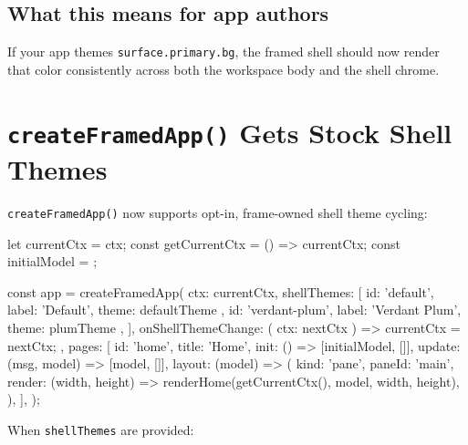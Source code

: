 \subsection{What this means for app authors}\label{record-279-what-this-means-for-app-authors}

If your app themes \texttt{s\allowbreak{}u\allowbreak{}r\allowbreak{}f\allowbreak{}a\allowbreak{}c\allowbreak{}e\allowbreak{}.\allowbreak{}p\allowbreak{}r\allowbreak{}i\allowbreak{}m\allowbreak{}a\allowbreak{}r\allowbreak{}y\allowbreak{}.\allowbreak{}b\allowbreak{}g}, the framed shell should now render that color consistently across both the workspace body and the shell chrome.

\section{\texorpdfstring{\texttt{c\allowbreak{}r\allowbreak{}e\allowbreak{}a\allowbreak{}t\allowbreak{}e\allowbreak{}F\allowbreak{}r\allowbreak{}a\allowbreak{}m\allowbreak{}e\allowbreak{}d\allowbreak{}A\allowbreak{}p\allowbreak{}p\allowbreak{}(\allowbreak{})} Gets Stock Shell Themes}{ Gets Stock Shell Themes}}\label{record-279-createframedapp-gets-stock-shell-themes}

\texttt{c\allowbreak{}r\allowbreak{}e\allowbreak{}a\allowbreak{}t\allowbreak{}e\allowbreak{}F\allowbreak{}r\allowbreak{}a\allowbreak{}m\allowbreak{}e\allowbreak{}d\allowbreak{}A\allowbreak{}p\allowbreak{}p\allowbreak{}(\allowbreak{})} now supports opt-in, frame-owned shell theme cycling:

\begin{CodeBlock}
let currentCtx = ctx;
const getCurrentCtx = () => currentCtx;
const initialModel = {};

const app = createFramedApp({
  ctx: currentCtx,
  shellThemes: [
    { id: 'default', label: 'Default', theme: defaultTheme },
    { id: 'verdant-plum', label: 'Verdant Plum', theme: plumTheme },
  ],
  onShellThemeChange: ({ ctx: nextCtx }) => {
    currentCtx = nextCtx;
  },
  pages: [{
    id: 'home',
    title: 'Home',
    init: () => [initialModel, []],
    update: (msg, model) => [model, []],
    layout: (model) => ({
      kind: 'pane',
      paneId: 'main',
      render: (width, height) => renderHome(getCurrentCtx(), model, width, height),
    }),
  }],
});
\end{CodeBlock}

When \texttt{s\allowbreak{}h\allowbreak{}e\allowbreak{}l\allowbreak{}l\allowbreak{}T\allowbreak{}h\allowbreak{}e\allowbreak{}m\allowbreak{}e\allowbreak{}s} are provided:

